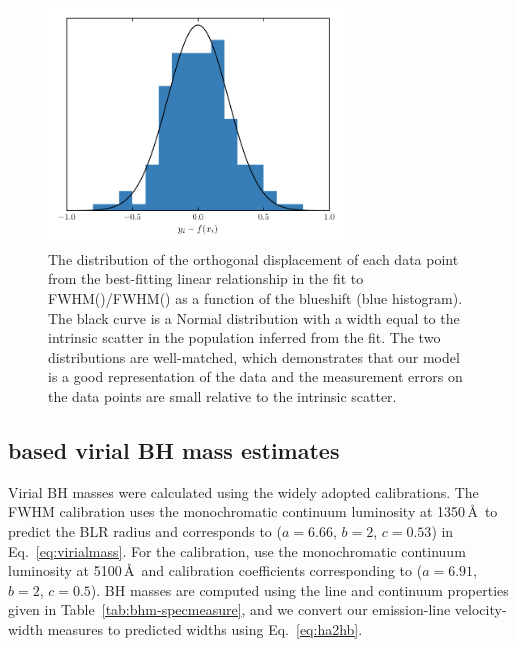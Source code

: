 \begin{figure}[h!]
    \centering 
    \includegraphics[width=0.7\textwidth]{figures/chapter03/intrinsic_scatter.pdf} 
    \caption[{The distribution of the orthogonal displacement of each data point from the best-fitting linear relationship in the fit to FWHM()/FWHM(\hans) as a function of the  blueshift.}]{The distribution of the orthogonal displacement of each data point from the best-fitting linear relationship in the fit to FWHM()/FWHM(\hans) as a function of the  blueshift (blue histogram). The black curve is a Normal distribution with a width equal to the intrinsic scatter in the population inferred from the fit. The two distributions are well-matched, which demonstrates that our model is a good representation of the data and the measurement errors on the data points are small relative to the intrinsic scatter.} 
    \label{fig:intrinsic_scatter}
\end{figure}

\subsection{ based virial BH mass estimates}

Virial BH masses were calculated using the widely adopted \citet{vestergaard06} calibrations. 
The \citet{vestergaard06}  FWHM calibration uses the monochromatic continuum luminosity at 1350\,\AA\, to predict the BLR radius and corresponds to ($a=6.66$, $b=2$, $c=0.53$) in Eq.~\ref{eq:virialmass}. 
For the \hb calibration, \citet{vestergaard06} use the monochromatic continuum luminosity at 5100\,\AA\, and calibration coefficients corresponding to ($a=6.91$, $b=2$, $c=0.5$).
BH masses are computed using the line and continuum properties given in Table~\ref{tab:bhm-specmeasure}, and we convert our \ha emission-line velocity-width measures to predicted \hb widths using Eq.~\ref{eq:ha2hb}.

